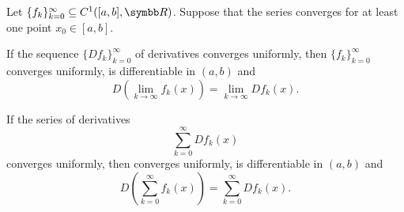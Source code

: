 \begin{corollary}\label{thm:derivative_limit_exchange}\cite[theorem 7.17]{Rudin1976}
  Let \( \{ f_k \}_{k=0}^\infty \subseteq C^1([a, b], \BR) \). Suppose that the series  converges for at least one point \( x_0 \in [a, b] \).

  \begin{corenum}
     If the sequence \( \{ D f_k \}_{k=0}^\infty \) of derivatives converges uniformly, then \( \{ f_k \}_{k=0}^\infty \) converges uniformly, is differentiable in \( (a, b) \) and
    \begin{equation*}
      D\left(\lim_{k \to \infty} f_k(x) \right) = \lim_{k \to \infty} D f_k(x).
    \end{equation*}

     If the series of derivatives
    \begin{equation}\label{thm:derivative_limit_exchange/derivative_series}
      \sum_{k=0}^\infty D f_k(x)
    \end{equation}
    converges uniformly, then  converges uniformly, is differentiable in \( (a, b) \) and
    \begin{equation*}
      D\left(\sum_{k=0}^\infty f_k(x)\right) = \sum_{k=0}^\infty D f_k(x).
    \end{equation*}
  \end{corenum}
\end{corollary}
